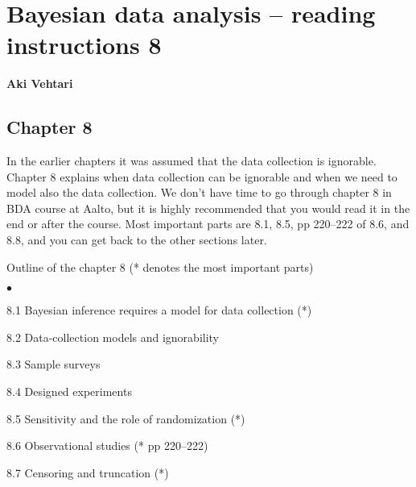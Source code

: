 \documentclass[a4paper,11pt,english]{article}
\begin{document}
\thispagestyle{empty}

\section*{Bayesian data analysis -- reading instructions 8} 
\smallskip
{\bf Aki Vehtari}
\smallskip

\subsection*{Chapter 8}

In the earlier chapters it was assumed that the data collection is
ignorable. Chapter 8 explains when data collection can be ignorable
and when we need to model also the data collection.
We don't have time to go through chapter 8 in BDA course at Aalto, but
it is highly recommended that you would read it in the end or after
the course. Most important parts are 8.1, 8.5, pp 220--222 of 8.6, and
8.8, and you can get back to the other sections later.

Outline of the chapter 8 (* denotes the most important parts)
\begin{list}{$\bullet$}{\parsep=0pt\itemsep=2pt}
\item 8.1 Bayesian inference requires a model for data collection  (*)
\item 8.2 Data-collection models and ignorability
\item 8.3 Sample surveys
\item 8.4 Designed experiments
\item 8.5 Sensitivity and the role of randomization (*)
\item 8.6 Observational studies (* pp 220--222)
\item 8.7 Censoring and truncation (*)
\end{list}
\end{document}
